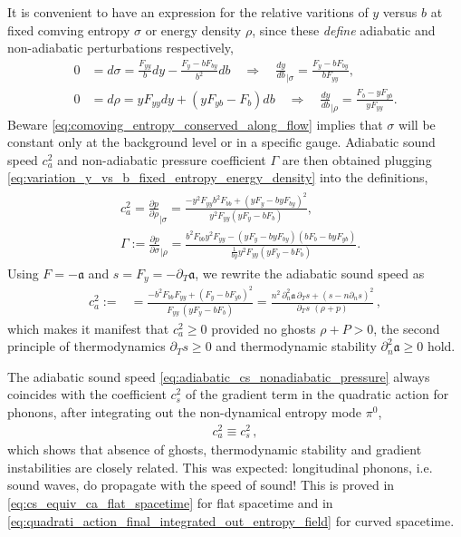It is convenient to have an expression for the relative varitions of $y$ versus $b$ at fixed comving entropy $\sigma$ or energy density $\rho$, since these \emph{define} adiabatic and non-adiabatic perturbations respectively,
\begin{align}\label{eq:variation_y_vs_b_fixed_entropy_energy_density}
    0&=d\sigma = \frac{F_{yy}}{b}dy - \frac{F_y-bF_{by}}{b^2}db\quad \Rightarrow\quad \frac{dy}{db}_{|\sigma}= \frac{F_y-bF_{by}}{bF_{yy}},\\[3pt]
    0&=d\rho=yF_{yy}dy+(yF_{yb}-F_b)db\quad \Rightarrow\quad \frac{dy}{db}_{|\rho}=\frac{F_b-yF_{yb}}{yF_{yy}}.
\end{align}
Beware \eqref{eq:comoving_entropy_conserved_along_flow} implies that $\sigma$ will be constant only at the background level or in a specific gauge.
Adiabatic sound speed $c_a^2$ and non-adiabatic pressure coefficient $\Gamma$ are then obtained plugging \eqref{eq:variation_y_vs_b_fixed_entropy_energy_density} into the definitions,
{\small\begin{align}\label{eq:adiabatic_cs_nonadiabatic_pressure}
\begin{aligned}
    &c_a^2=\frac{\partial p}{\partial \rho}_{|\sigma}=\frac{-y^2F_{yy}b^2F_{bb}+(yF_y-byF_{by})^2}{y^2F_{yy}(yF_y-bF_b)}, \\
    &\Gamma:=\frac{\partial p}{\partial \sigma}_{\mid\rho}= \frac{b^2F_{bb}y^2F_{yy}-(yF_y-byF_{by})(bF_b-byF_{yb})}{\tfrac{1}{by}y^2F_{yy}(yF_y-bF_b)}.
\end{aligned}
\end{align}}
Using $F=-\mathfrak{a}$ and $s=F_y=-\partial_T\mathfrak{a}$, we rewrite the adiabatic sound speed as
\begin{align}
    c_a^2:=
    &=\frac{-b^2F_{bb} F_{yy}+(F_y-bF_{yb})^2}{F_{yy}\,(yF_y-bF_b)} = \frac{n^2\,\partial_n^2\mathfrak{a}\,\partial_Ts + (s-n\partial_ns)^2}{\partial_Ts\,\,(\rho+p)}\,,
\end{align}
which makes it manifest that $c_a^2\geq0$ provided no ghosts $\rho+P>0$, the second principle of thermodynamics $\partial_Ts\geq 0$ and thermodynamic stability $\partial_n^2\mathfrak{a}\geq 0$ hold.

The adiabatic sound speed \eqref{eq:adiabatic_cs_nonadiabatic_pressure} always coincides with the coefficient $c_s^2$ of the gradient term in the quadratic action for phonons, after integrating out the non-dynamical entropy mode $\pi^0$,
\begin{align}
    c_a^2\equiv c_s^2\,,
\end{align}
which shows that absence of ghosts, thermodynamic stability and gradient instabilities are closely related.
This was expected: longitudinal phonons, i.e. sound waves, do propagate with the speed of sound!
This is proved in \eqref{eq:cs_equiv_ca_flat_spacetime} for flat spacetime and in \eqref{eq:quadrati_action_final_integrated_out_entropy_field} for curved spacetime.


